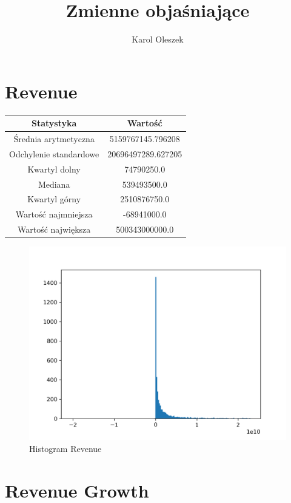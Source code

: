 \documentclass{article}
\begin{document}
\title{Zmienne objaśniające}
\author{Karol Oleszek}

\maketitle
\newpage
\tableofcontents

\newpage
\section{ Revenue }

\begin{center}
    \begin{tabular}{|c | c|} 
    \hline
    Statystyka & Wartość \\
    \hline\hline
    Średnia arytmetyczna & 5159767145.796208 \\ 
    \hline
    Odchylenie standardowe & 20696497289.627205 \\
    \hline
    Kwartyl dolny & 74790250.0 \\
    \hline
    Mediana & 539493500.0 \\
    \hline
    Kwartyl górny & 2510876750.0 \\
    \hline
    Wartość najmniejsza & -68941000.0 \\
    \hline
    Wartość największa & 500343000000.0 \\
    \hline
   \end{tabular}
\end{center}

\begin{figure}[h!]
    \includegraphics[width=\linewidth]{variables/Revenue.png}
    \caption{Histogram Revenue }
\end{figure}\section{ Revenue Growth }
\end{document}
